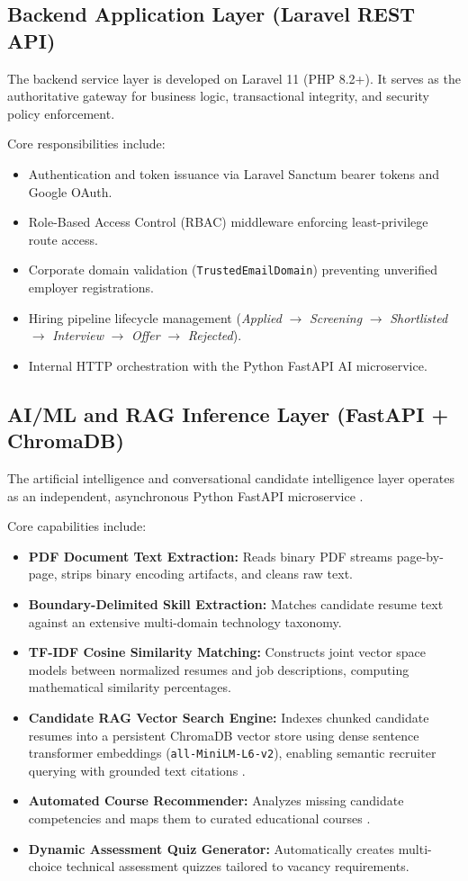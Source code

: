 \subsection{Backend Application Layer (Laravel REST API)}
The backend service layer is developed on Laravel 11 (PHP 8.2+). It serves as the authoritative gateway for business logic, transactional integrity, and security policy enforcement. 

Core responsibilities include:
\begin{itemize}
    \item Authentication and token issuance via Laravel Sanctum bearer tokens and Google OAuth.
    \item Role-Based Access Control (RBAC) middleware enforcing least-privilege route access.
    \item Corporate domain validation (\texttt{TrustedEmailDomain}) preventing unverified employer registrations.
    \item Hiring pipeline lifecycle management (\textit{Applied} $\rightarrow$ \textit{Screening} $\rightarrow$ \textit{Shortlisted} $\rightarrow$ \textit{Interview} $\rightarrow$ \textit{Offer} $\rightarrow$ \textit{Rejected}).
    \item Internal HTTP orchestration with the Python FastAPI AI microservice.
\end{itemize}

\subsection{AI/ML and RAG Inference Layer (FastAPI + ChromaDB)}
The artificial intelligence and conversational candidate intelligence layer operates as an independent, asynchronous Python FastAPI microservice \cite{ramirez2019fastapi}.

Core capabilities include:
\begin{itemize}
    \item \textbf{PDF Document Text Extraction:} Reads binary PDF streams page-by-page, strips binary encoding artifacts, and cleans raw text.
    \item \textbf{Boundary-Delimited Skill Extraction:} Matches candidate resume text against an extensive multi-domain technology taxonomy.
    \item \textbf{TF-IDF Cosine Similarity Matching:} Constructs joint vector space models between normalized resumes and job descriptions, computing mathematical similarity percentages.
    \item \textbf{Candidate RAG Vector Search Engine:} Indexes chunked candidate resumes into a persistent ChromaDB vector store using dense sentence transformer embeddings (\texttt{all-MiniLM-L6-v2}), enabling semantic recruiter querying with grounded text citations \cite{lewis2020rag}.
    \item \textbf{Automated Course Recommender:} Analyzes missing candidate competencies and maps them to curated educational courses \cite{karimi2020course}.
    \item \textbf{Dynamic Assessment Quiz Generator:} Automatically creates multi-choice technical assessment quizzes tailored to vacancy requirements.
\end{itemize}

